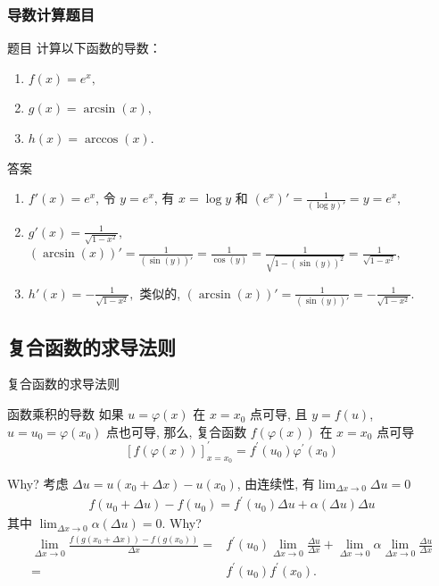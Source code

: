 \documentclass[
10pt,
aspectratio=43,
]{beamer}
\begin{document}
\begin{frame}
	\frametitle{导数计算题目}
	\begin{exampleblock}{题目}
		计算以下函数的导数：
		\begin{enumerate}
			\item $f(x) = e^x,$
			\item $g(x) = \arcsin(x),$
			\item $h(x) = \arccos(x).$
		\end{enumerate}
	\end{exampleblock}

	\pause

	\begin{exampleblock}{答案}
		\begin{enumerate}
			\item $f'(x) = e^x$, 令 $y=e^x$, 有 $x=\log y$ 和 $(e^x)'=\displaystyle\frac{1}{(\log y)'}=y=e^x,$
			\item $g'(x) = \displaystyle\frac{1}{\sqrt{1-x^2}},$ $(\arcsin(x))'=\displaystyle\frac{1}{(\sin (y))'}=\frac{1}{\cos(y)}=\frac{1}{\sqrt{1-(\sin(y))^2}}=\frac{1}{\sqrt{1-x^2}},$
			\item $h'(x) = -\displaystyle\frac{1}{\sqrt{1-x^2}},$ 类似的, $(\arcsin(x))'=\displaystyle\frac{1}{(\sin (y))'}=-\frac{1}{\sqrt{1-x^2}}.$
		\end{enumerate}
	\end{exampleblock}
\end{frame}


\subsection{复合函数的求导法则}
\begin{frame}{复合函数的求导法则}
	\begin{block}{函数乘积的导数}
		如果 $u=\varphi(x)$ 在 $x=x_0$ 点可导, 且 $y=f(u)$, $u=u_0=\varphi\left(x_0\right)$ 点也可导, 那么, 复合函数 $f(\varphi(x))$ 在 $x=x_0$ 点可导
		\[
			[f(\varphi(x))]_{x=x_0}^{\prime}=f^{\prime}\left(u_0\right) \varphi^{\prime}\left(x_0\right)
		\]
	\end{block}
	Why? \pause 考虑 $\Delta u = u(x_0+\Delta x) - u(x_0)$, \pause 由连续性, 有$\lim_{\Delta x\to0}\Delta u=0$ \pause
	\begin{align*}
		f\left(u_0+\Delta u\right)-f\left(u_0\right)=f^{\prime}\left(u_0\right) \Delta u+\alpha(\Delta u) \Delta u
	\end{align*}
	其中 $\lim_{\Delta x\to0}\alpha(\Delta u)=0$. \pause Why? \pause
	\begin{align*}
		\lim _{\Delta x \rightarrow 0} \frac{f\left(g\left(x_0+\Delta x\right)\right)-f\left(g\left(x_0\right)\right)}{\Delta x}= & f^{\prime}\left(u_0\right) \lim _{\Delta x \rightarrow 0} \frac{\Delta u}{\Delta x}+\lim _{\Delta x \rightarrow 0} \alpha \lim _{\Delta x \rightarrow 0} \frac{\Delta u}{\Delta x} \\
		=& f^{\prime}\left(u_0\right)f^{\prime}\left(x_0\right).
	\end{align*}
\end{frame}
\end{document}
